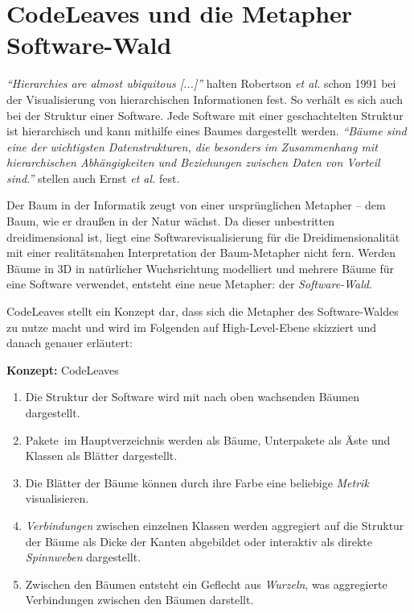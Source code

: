 \section{CodeLeaves und die Metapher Software-Wald}
\label{sec:idea}

\emph{``Hierarchies are almost ubiquitous [...]''} \cite{robertson1991cone} halten Robertson \emph{et al.}
 schon 1991 bei der Visualisierung von hierarchischen Informationen fest. So verhält es sich auch bei der Struktur einer Software. Jede Software mit einer geschachtelten Struktur ist hierarchisch und kann mithilfe eines Baumes dargestellt werden. \emph{"`Bäume sind eine der wichtigsten Datenstrukturen, die besonders im Zusammenhang mit hierarchischen Abhängigkeiten und Beziehungen zwischen Daten von Vorteil sind."'} \cite{ernst2016grundkurs} stellen auch Ernst \emph{et al.} fest.

Der Baum in der Informatik zeugt von einer ursprünglichen Metapher -- dem Baum, wie er draußen in der Natur wächst. Da dieser unbestritten dreidimensional ist, liegt eine Softwarevisualisierung für die Dreidimensionalität mit einer realitätsnahen Interpretation der Baum-Metapher nicht fern. Werden Bäume in 3D in natürlicher Wuchsrichtung modelliert und mehrere Bäume für eine Software verwendet, entsteht eine neue Metapher: der \emph{Software-Wald}.

CodeLeaves stellt ein Konzept dar, dass sich die Metapher des Software-Waldes zu nutze macht und wird im Folgenden auf High-Level-Ebene skizziert und danach genauer erläutert:

\begin{titlebox}{\textbf{Konzept:} CodeLeaves}
  \begin{enumerate}[leftmargin=1em]
    \item Die Struktur der Software wird mit nach oben wachsenden Bäumen dargestellt.
    \item Pakete\ im Hauptverzeichnis werden als Bäume, Unterpakete als Äste und Klassen als Blätter dargestellt.
    \item Die Blätter der Bäume können durch ihre Farbe eine beliebige \textit{Metrik}\footnotemark[1]{} visualisieren.
    \item \textit{Verbindungen}\footnotemark[2]{} zwischen einzelnen Klassen werden aggregiert auf die Struktur der Bäume als Dicke der Kanten abgebildet oder interaktiv als direkte \emph{Spinnweben} dargestellt.
    \item Zwischen den Bäumen entsteht ein Geflecht aus \emph{Wurzeln}, was aggregierte Verbindungen zwischen den Bäumen darstellt.
  \end{enumerate}
\end{titlebox}

